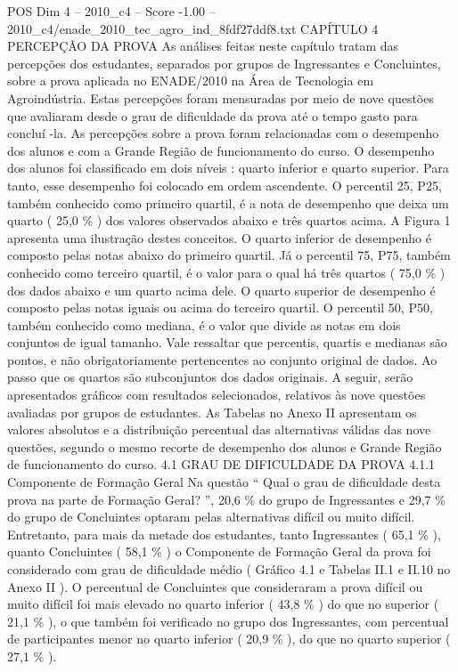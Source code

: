 \begin{textsample}{POS Dim 4 – 2010\_c4 – Score -1.00 – 2010\_c4/enade\_2010\_tec\_agro\_ind\_8fdf27ddf8.txt}  \label{ex:f4_pos_298}
CAPÍTULO 4 PERCEPÇÃO DA PROVA As análises feitas neste capítulo tratam das percepções dos estudantes, separados por grupos de Ingressantes e Concluintes, sobre a prova aplicada no ENADE/2010 na Área de Tecnologia em Agroindústria.
Estas percepções foram mensuradas por meio de nove questões que avaliaram desde o grau de dificuldade da prova até o tempo gasto para concluí -la.
As percepções sobre a prova foram relacionadas com o desempenho dos alunos e com a Grande Região de funcionamento do curso.
O desempenho dos alunos foi classificado em dois níveis : quarto inferior e quarto superior.
Para tanto, esse desempenho foi colocado em ordem ascendente.
O percentil 25, P25, também conhecido como primeiro quartil, é a nota de desempenho que deixa um quarto ( 25,0 \% ) dos valores observados abaixo e três quartos acima.
A Figura 1 apresenta uma ilustração destes conceitos.
O quarto inferior de desempenho é composto pelas notas abaixo do primeiro quartil.
Já o percentil 75, P75, também conhecido como terceiro quartil, é o valor para o qual há três quartos ( 75,0 \% ) dos dados abaixo e um quarto acima dele.
O quarto superior de desempenho é composto pelas notas iguais ou acima do terceiro quartil.
O percentil 50, P50, também conhecido como mediana, é o valor que divide as notas em dois conjuntos de igual tamanho.
Vale ressaltar que percentis, quartis e medianas são pontos, e não obrigatoriamente pertencentes ao conjunto original de dados.
Ao passo que os quartos são subconjuntos dos dados originais.
A seguir, serão apresentados gráficos com resultados selecionados, relativos às nove questões avaliadas por grupos de estudantes.
As Tabelas no Anexo II apresentam os valores absolutos e a distribuição percentual das alternativas válidas das nove questões, segundo o mesmo recorte de desempenho dos alunos e Grande Região de funcionamento do curso. 4.1 GRAU DE DIFICULDADE DA PROVA 4.1.1 Componente de Formação Geral Na questão “ Qual o grau de dificuldade desta prova na parte de Formação Geral? ”, 20,6 \% do grupo de Ingressantes e 29,7 \% do grupo de Concluintes optaram pelas alternativas difícil ou muito difícil.
Entretanto, para mais da metade dos estudantes, tanto Ingressantes ( 65,1 \% ), quanto Concluintes ( 58,1 \% ) o Componente de Formação Geral da prova foi considerado com grau de dificuldade médio ( Gráfico 4.1 e Tabelas II.1 e II.10 no Anexo II ).
O percentual de Concluintes que consideraram a prova difícil ou muito difícil foi mais elevado no quarto inferior ( 43,8 \% ) do que no superior ( 21,1 \% ), o que também foi verificado no grupo dos Ingressantes, com percentual de participantes menor no quarto inferior ( 20,9 \% ), do que no quarto superior ( 27,1 \% ).

\end{textsample}
